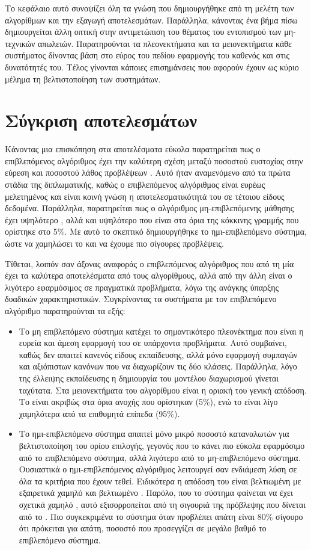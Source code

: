Το κεφάλαιο αυτό συνοψίζει όλη τα γνώση που δημιουργήθηκε από τη μελέτη των αλγορίθμων και την εξαγωγή αποτελεσμάτων. Παράλληλα, κάνοντας ένα βήμα πίσω δημιουργείται άλλη οπτική στην αντιμετώπιση του θέματος του εντοπισμού των μη-τεχνικών απωλειών. Παρατηρούνται τα πλεονεκτήματα και τα μειονεκτήματα κάθε συστήματος δίνοντας βάση στο εύρος του πεδίου εφαρμογής του καθενός και στις δυνατότητές του. Τέλος γίνονται κάποιες επισημάνσεις που αφορούν έχουν ως κύριο μέλημα τη βελτιστοποίηση των συστημάτων.
\section{Σύγκριση αποτελεσμάτων}
Κάνοντας μια επισκόπηση στα αποτελέσματα εύκολα παρατηρείται πως ο επιβλεπόμενος αλγόριθμος έχει την καλύτερη σχέση μεταξύ ποσοστού ευστοχίας στην εύρεση  και ποσοστού λάθος προβλέψεων . Αυτό ήταν αναμενόμενο από τα πρώτα στάδια της διπλωματικής, καθώς ο επιβλεπόμενος αλγόριθμος είναι ευρέως μελετημένος και είναι κοινή γνώση η αποτελεσματικότητά του σε τέτοιου είδους δεδομένα. Παράλληλα, παρατηρείται πως ο αλγόριθμος μη-επιβλεπόμενης μάθησης έχει υψηλότερο , αλλά και υψηλότερο  που είναι στα όρια της κόκκινης γραμμής που ορίστηκε στο 5\%. Με αυτό το σκεπτικό δημιουργήθηκε το ημι-επιβλεπόμενο σύστημα, ώστε να χαμηλώσει το  και να έχουμε πιο σίγουρες προβλέψεις.\par
Τίθεται, λοιπόν σαν άξονας αναφοράς ο επιβλεπόμενος αλγόριθμος που από τη μία έχει τα καλύτερα αποτελέσματα από τους αλγορίθμους, αλλά από την άλλη είναι ο λιγότερο εφαρμόσιμος σε πραγματικά προβλήματα, λόγω της ανάγκης ύπαρξης δυαδικών χαρακτηριστικών. Συγκρίνοντας τα συστήματα με τον επιβλεπόμενο αλγόριθμο παρατηρούνται τα εξής:
\begin{itemize}
\item Το μη επιβλεπόμενο σύστημα κατέχει το σημαντικότερο πλεονέκτημα που είναι η ευρεία και άμεση εφαρμογή του σε υπάρχοντα προβλήματα. Αυτό συμβαίνει, καθώς δεν απαιτεί κανενός είδους εκπαίδευσης, αλλά μόνο εφαρμογή συμπαγών και αξιόπιστων κανόνων που να διαχωρίζουν τις δύο κλάσεις. Παράλληλα, λόγο της έλλειψης εκπαίδευσης η δημιουργία του μοντέλου διαχωρισμού γίνεται ταχύτατα. Στα μειονεκτήματα του αλγορίθμου είναι η οριακή του γενική απόδοση. Το  είναι ακριβώς στα όρια ανοχής που ορίστηκαν (5\%), ενώ το  είναι λίγο χαμηλότερα από τα επιθυμητά επίπεδα (95\%).
\item Το ημι-επιβλεπόμενο σύστημα απαιτεί μόνο μικρό ποσοστό καταναλωτών για βελτιστοποίηση του ορίου επιλογής, γεγονός που το κάνει πιο εύκολα εφαρμόσιμο από το επιβλεπόμενο σύστημα, αλλά λιγότερο από το μη-επιβλεπόμενο σύστημα. Ουσιαστικά ο ημι-επιβλεπόμενος αλγόριθμος λειτουργεί σαν ενδιάμεση λύση σε όλα τα κριτήρια που έχουν τεθεί. Ειδικότερα η απόδοση του είναι βελτιωμένη με εξαιρετικά χαμηλό  και βελτιωμένο . Παρόλο, που το σύστημα φαίνεται να έχει σχετικά χαμηλό , αυτό εξισορροπείται από τη σιγουριά της πρόβλεψης που δίνεται από το . Πιο συγκεκριμένα το σύστημα όταν προβλέπει απάτη είναι 80\% σίγουρο ότι πρόκειται για απάτη, ποσοστό που προσεγγίζει σε μεγάλο βαθμό το επιβλεπόμενο σύστημα.
\end{itemize}

